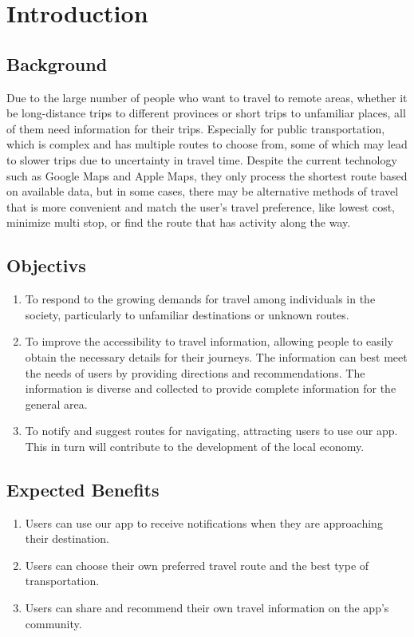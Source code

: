 \chapter{Introduction}
\section{Background}
Due to the large number of people who want to travel to remote areas, whether it be long-distance trips to different provinces or short trips to unfamiliar places, all of them need information for their trips. Especially for public transportation, which is complex and has multiple routes to choose from, some of which may lead to slower trips due to uncertainty in travel time. Despite the current technology such as Google Maps and Apple Maps, they only process the shortest route based on available data, but in some cases, there may be alternative methods of travel that is more convenient and match the user's travel preference, like lowest cost, minimize multi stop, or find the route that has activity along the way. \cite{statistics2017}

\section{Objectivs}
\begin{enumerate}
    \item To respond to the growing demands for travel among individuals in the society, particularly to unfamiliar destinations or unknown routes.
    \item To improve the accessibility to travel information, allowing people to easily obtain the necessary details for their journeys. The information can best meet the needs of users by providing directions and recommendations. The information is diverse and collected to provide complete information for the general area.
    \item To notify and suggest routes for navigating, attracting users to use our app. This in turn will contribute to the development of the local economy.
\end{enumerate}

\section{Expected Benefits}
\begin{enumerate}
    \item Users can use our app to receive notifications when they are approaching their destination.
    \item Users can choose their own preferred travel route and the best type of transportation.
    \item Users can share and recommend their own travel information on the app's community.
\end{enumerate}

